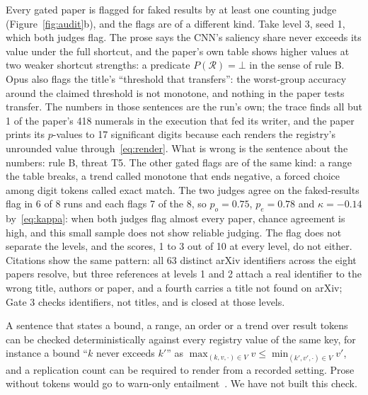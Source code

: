 \documentclass[sigconf,anonymous]{aamas}
\newcommand{\Reg}{\mathcal{R}}
\begin{document}
Every gated paper is flagged for faked results by at least one counting judge (Figure~\ref{fig:audit}b), and the flags are of a different kind.
Take level 3, seed 1, which both judges flag.
The prose says the CNN's saliency share never exceeds its value under the full shortcut, and the paper's own table shows higher values at two weaker shortcut strengths: a predicate $P(\Reg) = \bot$ in the sense of rule B.
Opus also flags the title's ``threshold that transfers'': the worst-group accuracy around the claimed threshold is not monotone, and nothing in the paper tests transfer.
The numbers in those sentences are the run's own; the trace finds all but 1 of the paper's 418 numerals in the execution that fed its writer, and the paper prints its $p$-values to 17 significant digits because each renders the registry's unrounded value through~\eqref{eq:render}.
What is wrong is the sentence about the numbers: rule B, threat T5.
The other gated flags are of the same kind: a range the table breaks, a trend called monotone that ends negative, a forced choice among digit tokens called exact match.
The two judges agree on the faked-results flag in 6 of 8 runs and each flags 7 of the 8, so $p_o = 0.75$, $p_e = 0.78$ and $\kappa = -0.14$ by~\eqref{eq:kappa}: when both judges flag almost every paper, chance agreement is high, and this small sample does not show reliable judging.
The flag does not separate the levels, and the scores, 1 to 3 out of 10 at every level, do not either.
Citations show the same pattern: all 63 distinct arXiv identifiers across the eight papers resolve, but three references at levels 1 and 2 attach a real identifier to the wrong title, authors or paper, and a fourth carries a title not found on arXiv; Gate 3 checks identifiers, not titles, and is closed at those levels.

A sentence that states a bound, a range, an order or a trend over result tokens can be checked deterministically against every registry value of the same key, for instance a bound ``$k$ never exceeds $k'$'' as $\max_{(k, v, \cdot) \in V} v \le \min_{(k', v', \cdot) \in V} v'$, and a replication count can be required to render from a recorded setting.
Prose without tokens would go to warn-only entailment~\cite{tang2024minicheck}.
We have not built this check.
\end{document}
